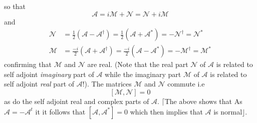 \documentclass[aps,preprint]{revtex4}%
\begin{document}
so that
\begin{equation}
\mathcal{A}=i\mathcal{M}+\mathcal{N}=\mathcal{N}+i\mathcal{M}%
\end{equation}
and
\begin{align}
\mathcal{N}  & =\frac{1}{2}\left(  \mathcal{A}-\mathcal{A}^{\dagger}\right)
=\frac{1}{2}\left(  \mathcal{A}+\mathcal{A}^{\ast}\right)  =-\mathcal{N}%
^{\dagger}=\mathcal{N}^{\ast}\nonumber\\
\mathcal{M}  & =\frac{-i}{2}\left(  \mathcal{A}+\mathcal{A}^{\dagger}\right)
=\frac{-i}{2}\left(  \mathcal{A}-\mathcal{A}^{\ast}\right)  =-\mathcal{M}%
^{\dagger}=\mathcal{M}^{\ast}%
\end{align}
confirming that $\mathcal{M}$ and $\mathcal{N}$ are real. (Note that the real
part $\mathcal{N}$ of $\mathcal{A}$ is related to self adjoint
\emph{imaginary} part of $\mathcal{A}$ while the imaginary part $\mathcal{M}$
of $\mathcal{A}$ is related to self adjoint \emph{real} part of $\mathcal{A}%
$!). The matrices $\mathcal{M}$ and $\mathcal{N}$ commute i.e
\begin{equation}
\left[  \mathcal{M},\mathcal{N}\right]  =0
\end{equation}
as do the self adjoint real and complex parts of $\mathcal{A}.$ $\lceil$The
above shows that As $\mathcal{A=-A}^{t}$ it it follows that $\left[
\mathcal{A},\mathcal{A}^{\ast}\right]  =0$ which then implies that
$\mathcal{A}$ is normal$\rfloor.$
\end{document}
